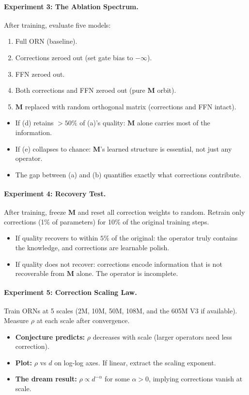 \documentclass[11pt, a4paper]{article}
\newcommand{\M}{\mathbf{M}}
\theoremstyle{plain}
\theoremstyle{definition}
\theoremstyle{remark}
\begin{document}
\paragraph{Experiment 3: The Ablation Spectrum.}
After training, evaluate five models:
\begin{enumerate}[nosep, label=(\alph*)]
\item Full ORN (baseline).
\item Corrections zeroed out (set gate bias to $-\infty$).
\item FFN zeroed out.
\item Both corrections and FFN zeroed out (pure $\M$ orbit).
\item $\M$ replaced with random orthogonal matrix (corrections and FFN intact).
\end{enumerate}
\begin{itemize}[nosep]
\item If (d) retains $>50\%$ of (a)'s quality: $\M$ alone carries most of the information.
\item If (e) collapses to chance: $\M$'s learned structure is essential, not just any operator.
\item The gap between (a) and (b) quantifies exactly what corrections contribute.
\end{itemize}

\paragraph{Experiment 4: Recovery Test.}
After training, freeze $\M$ and reset all correction weights to random.
Retrain only corrections (1\% of parameters) for 10\% of the original training steps.
\begin{itemize}[nosep]
\item If quality recovers to within $5\%$ of the original: the operator truly contains the knowledge, and corrections are learnable polish.
\item If quality does not recover: corrections encode information that is not recoverable from $\M$ alone. The operator is incomplete.
\end{itemize}

\paragraph{Experiment 5: Correction Scaling Law.}
Train ORNs at 5 scales (2M, 10M, 50M, 108M, and the 605M V3 if available).
Measure $\rho$ at each scale after convergence.
\begin{itemize}[nosep]
\item \textbf{Conjecture predicts:} $\rho$ decreases with scale (larger operators need less correction).
\item \textbf{Plot:} $\rho$ vs $d$ on log-log axes. If linear, extract the scaling exponent.
\item \textbf{The dream result:} $\rho \propto d^{-\alpha}$ for some $\alpha > 0$, implying corrections vanish at scale.
\end{itemize}
\end{document}
